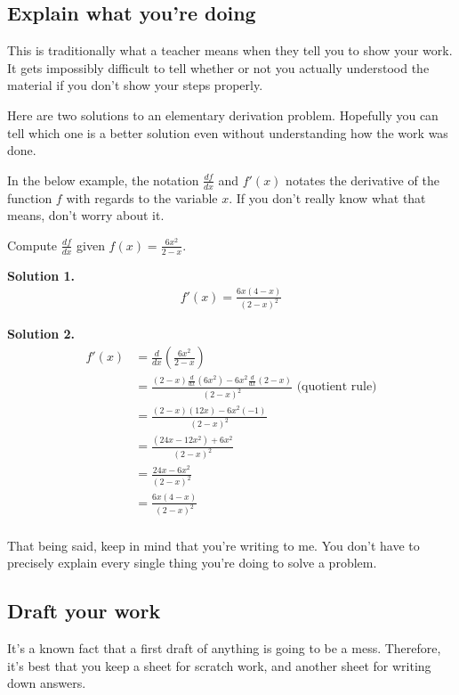 \subsection{Explain what you're doing}

This is traditionally what a teacher means when they tell you to show your work. It gets impossibly difficult to tell whether or not you actually understood the material if you don't show your steps properly. 

Here are two solutions to an elementary derivation problem. Hopefully you can tell which one is a better solution even without understanding how the work was done. 

In the below example, the notation $\frac{df}{dx}$ and $f'(x)$ notates the derivative of the function $f$ with regards to the variable $x$. If you don't really know what that means, don't worry about it.

\begin{example}
Compute $\frac{df}{dx}$ given $f(x) = \frac{6x^2}{2-x}$.
\end{example}

\textbf{Solution 1.}
\begin{align*}
    f'(x) = \frac{6x(4-x)}{(2-x)^2}
\end{align*}

\textbf{Solution 2.}
\begin{align*}
    f'(x) &= \frac{d}{dx}\left(\frac{6x^2}{2-x}\right)\\
        &= \frac{(2-x)\frac{d}{dx}(6x^2) - 6x^2\frac{d}{dx}(2-x)}{(2-x)^2} \text{ (quotient rule)}\\
        &= \frac{(2-x)(12x) - 6x^2(-1)}{(2-x)^2}\\
        &= \frac{(24x-12x^2) + 6x^2}{(2-x)^2}\\
        &= \frac{24x-6x^2}{(2-x)^2}\\
        &= \frac{6x(4-x)}{(2-x)^2}\\
\end{align*}

That being said, keep in mind that you're writing to me. You don't have to precisely explain every single thing you're doing to solve a problem. 

\subsection{Draft your work}

It's a known fact that a first draft of anything is going to be a mess. Therefore, it's best that you keep a sheet for scratch work, and another sheet for writing down answers. 

